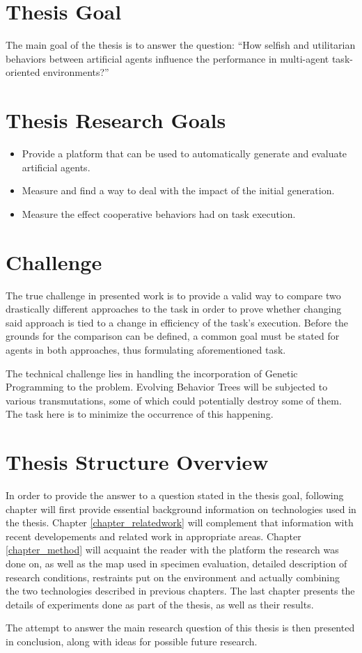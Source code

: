 \section{Thesis Goal}
The main goal of the thesis is to answer the question:
``How selfish and utilitarian behaviors between artificial agents influence the performance in multi-agent task-oriented environments?'' %
\section{Thesis Research Goals}
\begin{itemize}
    \item Provide a platform that can be used to automatically generate and evaluate artificial agents.
    \item Measure and find a way to deal with the impact of the initial generation.
    \item Measure the effect cooperative behaviors had on task execution.
\end{itemize}
\section{Challenge}
The true challenge in presented work is to provide a valid way to compare two drastically different approaches to the task in order to prove whether changing said approach is tied to a change in efficiency of the task's execution. Before the grounds for the comparison can be defined, a common goal must be stated for agents in both approaches, thus formulating aforementioned task.

The technical challenge lies in handling the incorporation of Genetic Programming to the problem. Evolving Behavior Trees will be subjected to various transmutations, some of which could potentially destroy some of them. The task here is to minimize the occurrence of this happening.
\section{Thesis Structure Overview}
In order to provide the answer to a question stated in the thesis goal, following chapter will first provide essential background information on technologies used in the thesis. Chapter \ref{chapter_relatedwork} will complement that information with recent developements and related work in appropriate areas. Chapter \ref{chapter_method} will acquaint the reader with the platform the research was done on, as well as the map used in specimen evaluation, detailed description of research conditions, restraints put on the environment and actually combining the two technologies described in previous chapters. The last chapter presents the details of experiments done as part of the thesis, as well as their results.

The attempt to answer the main research question of this thesis is then presented in conclusion, along with ideas for possible future research.
